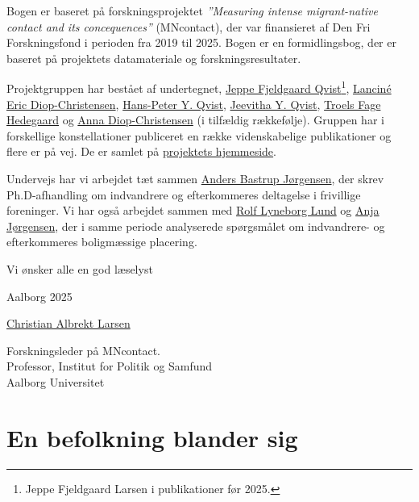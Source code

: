 \documentclass[
]{book}
\begin{document}
Bogen er baseret på forskningsprojektet \emph{''Measuring intense migrant-native contact and its concequences''} (MNcontact), der var finansieret af Den Fri Forskningsfond i perioden fra 2019 til 2025. Bogen er en formidlingsbog, der er baseret på projektets datamateriale og forskningsresultater.

Projektgruppen har bestået af undertegnet, \href{https://vbn.aau.dk/da/persons/jeppefl}{Jeppe Fjeldgaard Qvist}\footnote{Jeppe Fjeldgaard Larsen i publikationer før 2025.}, \href{https://vbn.aau.dk/en/persons/led}{Lanciné Eric Diop-Christensen}, \href{https://vbn.aau.dk/da/persons/hpq}{Hans-Peter Y. Qvist}, \href{https://vbn.aau.dk/en/persons/jy}{Jeevitha Y. Qvist}, \href{https://vbn.aau.dk/en/persons/troelsfh}{Troels Fage Hedegaard} og \href{https://dk.linkedin.com/in/anna-diop-christensen-58b5ba282}{Anna Diop-Christensen} (i tilfældig rækkefølje). Gruppen har i forskellige konstellationer publiceret en række videnskabelige publikationer og flere er på vej. De er samlet på \href{https://vbn.aau.dk/en/projects/measuring-intense-migrant-native-contact-and-its-consequences/publications/}{projektets hjemmeside}.

Undervejs har vi arbejdet tæt sammen \href{https://vbn.aau.dk/en/persons/anbajo}{Anders Bastrup Jørgensen}, der skrev Ph.D-afhandling om indvandrere og efterkommeres deltagelse i frivillige foreninger. Vi har også arbejdet sammen med \href{https://vbn.aau.dk/en/persons/rolfll}{Rolf Lyneborg Lund} og \href{https://vbn.aau.dk/en/persons/anjaj}{Anja Jørgensen}, der i samme periode analyserede spørgsmålet om indvandrere- og efterkommeres boligmæssige placering.

Vi ønsker alle en god læselyst

Aalborg 2025

\href{https://vbn.aau.dk/en/persons/albrekt}{Christian Albrekt Larsen}

Forskningsleder på MNcontact.\\
Professor, Institut for Politik og Samfund\\
Aalborg Universitet\\

\newpage

\tableofcontents

\clearpage
\pagestyle{fancy}

\chapter{En befolkning blander sig}\label{kap1}
\end{document}
